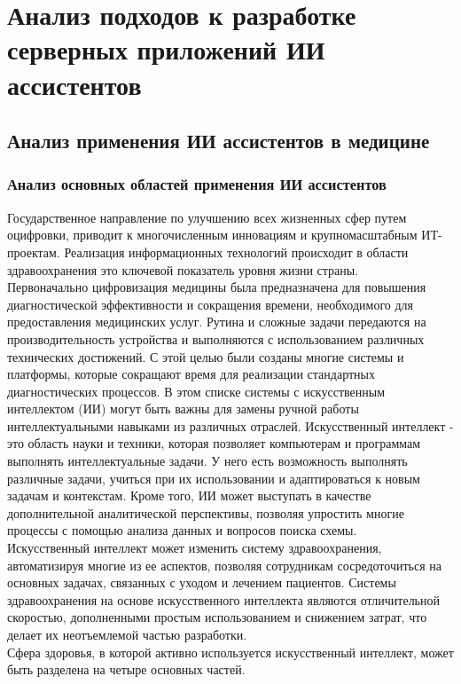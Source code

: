 \chapter{Анализ подходов к разработке серверных приложений ИИ ассистентов}
\label{chapter1}

\section{Анализ применения ИИ ассистентов в медицине}

\subsection{Анализ основных областей применения ИИ ассистентов}
Государственное направление по улучшению всех жизненных сфер путем оцифровки, приводит к многочисленным инновациям и крупномасштабным ИТ-проектам. Реализация информационных технологий происходит в области здравоохранения это ключевой показатель уровня жизни страны.\\
Первоначально цифровизация медицины была предназначена для повышения диагностической эффективности и сокращения времени, необходимого для предоставления медицинских услуг. Рутина и сложные задачи передаются на производительность устройства и выполняются с использованием различных технических достижений. С этой целью были созданы многие системы и платформы, которые сокращают время для реализации стандартных диагностических процессов. В этом списке системы с искусственным интеллектом (ИИ) могут быть важны для замены ручной работы интеллектуальными навыками из различных отраслей. Искусственный интеллект - это область науки и техники, которая позволяет компьютерам и программам выполнять интеллектуальные задачи. У него есть возможность выполнять различные задачи, учиться при их использовании и адаптироваться к новым задачам и контекстам. Кроме того, ИИ может выступать в качестве дополнительной аналитической перспективы, позволяя упростить многие процессы с помощью анализа данных и вопросов поиска схемы.\\
Искусственный интеллект может изменить систему здравоохранения, автоматизируя многие из ее аспектов, позволяя сотрудникам сосредоточиться на основных задачах, связанных с уходом и лечением пациентов. Системы здравоохранения на основе искусственного интеллекта являются отличительной скоростью, дополненными простым использованием и снижением затрат, что делает их неотъемлемой частью разработки.\\
Сфера здоровья, в которой активно используется искусственный интеллект, может быть разделена на четыре основных частей.

